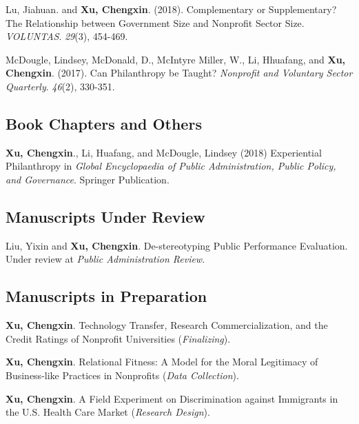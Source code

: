 \documentclass[letterpaper]{article}
\renewenvironment{itemize}{
  \begin{list}{}{
    \setlength{\leftmargin}{1.5em}
  }
}{
  \end{list}
}
\begin{document}
\begin{etaremune}
\item Lu, Jiahuan. and \textbf{Xu, Chengxin}. (2018). Complementary or Supplementary? The Relationship between Government Size and Nonprofit Sector Size. {\it VOLUNTAS}. {\it 29}(3), 454-469.

\item McDougle, Lindsey, McDonald, D., McIntyre Miller, W., Li, Hhuafang, and \textbf{Xu, Chengxin}. (2017). Can Philanthropy be Taught? {\it Nonprofit and Voluntary Sector Quarterly}. {\it 46}(2), 330-351. 

\end{etaremune}

\subsection*{Book Chapters and Others}
\begin{itemize}
	
\item \textbf{Xu, Chengxin}., Li, Huafang, and McDougle, Lindsey (2018) Experiential Philanthropy in {\it Global Encyclopaedia of Public Administration, Public Policy, and Governance}. Springer Publication.

\end{itemize}

\subsection*{Manuscripts Under Review}
\begin{itemize}
	
\item Liu, Yixin and \textbf{Xu, Chengxin}. De-stereotyping Public Performance Evaluation. Under review at {\it Public Administration Review}.

\end{itemize}


\subsection*{Manuscripts in Preparation}
\begin{itemize}

\item \textbf{Xu, Chengxin}. Technology Transfer, Research Commercialization, and the Credit Ratings of Nonprofit Universities ({\it Finalizing}).

\item \textbf{Xu, Chengxin}. Relational Fitness: A Model for the Moral Legitimacy of Business-like Practices in Nonprofits ({\it Data Collection}).

\item \textbf{Xu, Chengxin}. A Field Experiment on Discrimination against Immigrants in the U.S. Health Care Market ({\it Research Design}).

\end{itemize}
\end{document}
